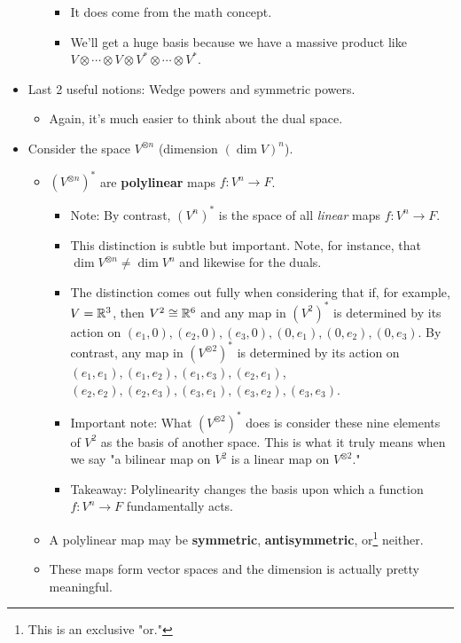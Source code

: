 \documentclass[../notes.tex]{subfiles}
\begin{document}
\begin{itemize}
\begin{itemize}
        \begin{itemize}
            \item It does come from the math concept.
            \item We'll get a huge basis because we have a massive product like $V\otimes\cdots\otimes V\otimes V^*\otimes\cdots\otimes V^*$.
        \end{itemize}
    \end{itemize}
    \item Last 2 useful notions: Wedge powers and symmetric powers.
    \begin{itemize}
        \item Again, it's much easier to think about the dual space.
    \end{itemize}
    \item Consider the space $V^{\otimes n}$ (dimension $(\dim V)^n$).
    \begin{itemize}
        \item $(V^{\otimes n})^*$ are \textbf{polylinear} maps $f:V^n\to F$.
        \begin{itemize}
            \item Note: By contrast, $(V^n)^*$ is the space of all \emph{linear} maps $f:V^n\to F$.
            \item This distinction is subtle but important. Note, for instance, that $\dim V^{\otimes n}\neq\dim V^n$ and likewise for the duals.
            \item The distinction comes out fully when considering that if, for example, $V=\mathbb{R}^3$, then $V^2\cong\mathbb{R}^6$ and any map in $(V^2)^*$ is determined by its action on $(e_1,0),(e_2,0),(e_3,0),(0,e_1),(0,e_2),(0,e_3)$. By contrast, any map in $(V^{\otimes 2})^*$ is determined by its action on $(e_1,e_1),(e_1,e_2),(e_1,e_3),(e_2,e_1)$, $(e_2,e_2),(e_2,e_3),(e_3,e_1),(e_3,e_2),(e_3,e_3)$.
            \item Important note: What $(V^{\otimes 2})^*$ does is consider these nine elements of $V^2$ as the basis of another space. This is what it truly means when we say "a bilinear map on $V^2$ is a linear map on $V^{\otimes 2}$."
            \item Takeaway: Polylinearity changes the basis upon which a function $f:V^n\to F$ fundamentally acts.
        \end{itemize}
        \item A polylinear map may be \textbf{symmetric}, \textbf{antisymmetric}, or\footnote{This is an exclusive "or."} neither.
        \item These maps form vector spaces and the dimension is actually pretty meaningful.

\end{itemize}
\end{itemize}
\end{document}
